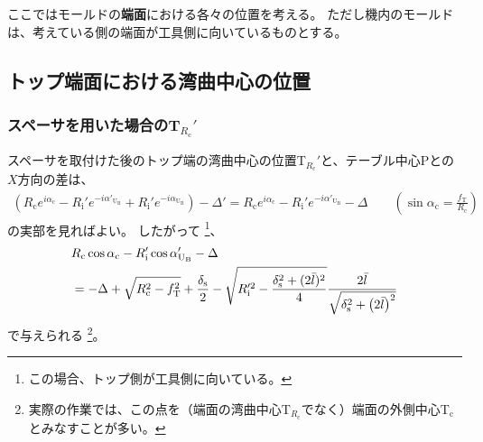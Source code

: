 

ここではモールドの\textbf{端面}における各々の位置を考える。
ただし機内のモールドは、考えている側の端面が工具側に向いているものとする。





\subsection{トップ端面における湾曲中心の位置}

\subsubsection{スペーサを用いた場合のT\texorpdfstring{$_{R_\mathrm c}'$}{Rc'}}
スペーサを取付けた後のトップ端の湾曲中心の位置T$_{R_\mathrm c}'$と、テーブル中心Pとの$X$方向の差は、
\begin{align*}
  \left(
    R_\mathrm ce^{i\alpha_\mathrm c}
    -R_\mathrm i'e^{-i\alpha'_{\mathrm U_\mathrm B}}
    +R_\mathrm i'e^{-i\alpha_{\mathrm U_\mathrm B}}
  \right)
  -\Delta'
  = R_\mathrm ce^{i\alpha_\mathrm c}-R_\mathrm i'e^{-i\alpha'_{\mathrm U_\mathrm B}}-\Delta \qquad
    \left(\sin\alpha_\mathrm c = \frac{f_\mathrm T}{R_\mathrm c}\right)
\end{align*}
の実部を見ればよい。
したがって
\footnote{この場合、トップ側が工具側に向いている。}、
\begin{align}
  \notag
  &  R_\mathrm c\cos\alpha_\mathrm c-R_\mathrm i'\cos\alpha'_{\mathrm U_\mathrm B}-\Delta\\
  &= -\Delta+\sqrt{R_\mathrm c^2-f_\mathrm T^2}+\frac{\delta_\mathrm s}2
     -\sqrt{R_\mathrm i'^2-\frac{\delta_\mathrm s^2+(2\bar l)^2}4}
      \frac{2\bar l}{\sqrt{\delta_\mathrm s^2+\left(2\bar l\right)^2}}
     \label{eq:spacerTRc}
\end{align}
で与えられる
\footnote{実際の作業では、この点を（端面の湾曲中心T$_{R_\mathrm c}\!$でなく）端面の外側中心T$_\mathrm c$とみなすことが多い。}。


